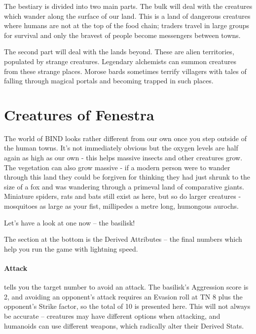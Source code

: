 \setcounter{bestiarychapter}{\thechapter}
The bestiary is divided into two main parts.  The bulk will deal with the creatures which wander along the surface of our land.  This is a land of dangerous creatures where humans are not at the top of the food chain; traders travel in large groups for survival and only the bravest of people become messengers between towns.

The second part will deal with the lands beyond.  These are alien territories, populated by strange creatures.  Legendary alchemists can summon creatures from these strange places.  Morose bards sometimes terrify villagers with tales of falling through magical portals and becoming trapped in such places.

\section{Creatures of Fenestra}

The world of BIND looks rather different from our own once you step outside of the human towns.  It's not immediately obvious but the oxygen levels are half again as high as our own - this helps massive insects and other creatures grow.  The vegetation can also grow massive - if a modern person were to wander through this land they could be forgiven for thinking they had just shrunk to the size of a fox and was wandering through a primeval land of comparative giants.  Miniature spiders, rats and bats still exist as here, but so do larger creatures  - mosquitoes as large as your fist, millipedes a metre long, humongous aurochs.

Let's have a look at one now -- the basilisk!

\basilisk

The section at the bottom is the Derived Attributes -- the final numbers which help you run the game with lightning speed.

\paragraph{Attack} tells you the target number to avoid an attack.  The basilisk's Aggression score is 2, and avoiding an opponent's attack requires an Evasion roll at TN 8 plus the opponent's Strike factor, so the total of 10 is presented here.  This will not always be accurate -- creatures may have different options when attacking, and humanoids can use different weapons, which radically alter their Derived Stats.

